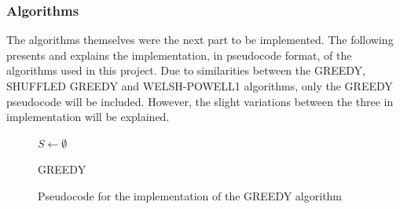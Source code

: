 \subsubsection{Algorithms}
The algorithms themselves were the next part to be implemented. The following presents and explains the implementation, in pseudocode format, of the algorithms used in this project. Due to similarities between the GREEDY, SHUFFLED GREEDY and WELSH-POWELL1 algorithms, only the GREEDY pseudocode will be included. However, the slight variations between the three in implementation will be explained. 

\begin{figure}[H]
    \centering
        \begin{algorithm}[H]
        \DontPrintSemicolon
        
        \BlankLine

        $S \leftarrow \emptyset$ \;
        
        \caption{GREEDY}
        \end{algorithm}
    \caption{Pseudocode for the implementation of the GREEDY algorithm}
    \label{fig:GreedyImpPseudo}
\end{figure}

